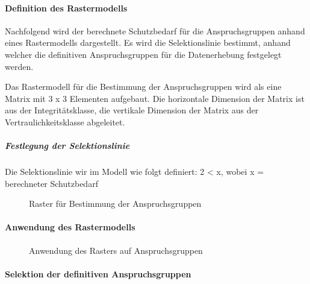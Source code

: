 \newpage

\paragraph*{Definition des Rastermodells}\mbox{}

\begin{sloppypar}
Nachfolgend wird der berechnete Schutzbedarf für die Anspruchsgruppen anhand eines Rastermodells dargestellt. Es wird die Selektionslinie bestimmt, anhand welcher die definitiven Anspruchsgruppen für die Datenerhebung festgelegt werden. 
\end{sloppypar}

\begin{sloppypar}
Das Rastermodell für die Bestimmung der Anspruchsgruppen wird als eine Matrix mit 3 x 3 Elementen aufgebaut. Die horizontale Dimension der Matrix ist aus der Integritätsklasse, die vertikale Dimension der Matrix aus der Vertraulichkeitsklasse abgeleitet.
\end{sloppypar}

\subparagraph*{Festlegung der Selektionslinie}\mbox{}

\begin{sloppypar}
Die Selektionslinie wir im Modell wie folgt definiert: 2 < x, wobei x = berechneter Schutzbedarf
\end{sloppypar}

\begin{figure}[H]
    \centering
    
    \caption{Raster für Bestimmung der Anspruchsgruppen}
    \label{fig:raster1}
\end{figure}

\newpage

\paragraph*{Anwendung des Rastermodells}\mbox{}

\blindtext

\begin{figure}[H]
    
    \caption{Anwendung des Rasters auf Anspruchsgruppen}
    \label{fig:raster2}
\end{figure}

\newpage

\paragraph*{Selektion der definitiven Anspruchsgruppen}\mbox{}

